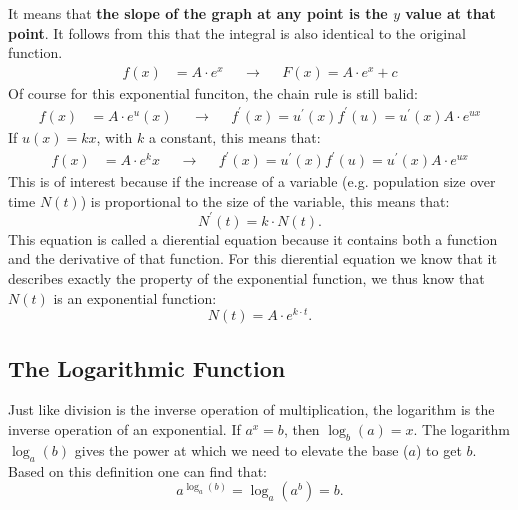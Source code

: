 \documentclass[a4paper]{report}
\begin{document}
It means that \textbf{the slope of the graph at any point is the $y$ value at that
point}. It follows from this that the integral is also identical to the original function.
\begin{align}
f(x)& = A \cdot e^x & &\rightarrow& &F(x) =  A \cdot e^x  + c
\end{align}
Of course for this exponential funciton, the chain rule is still balid:
\begin{align}
f(x)& = A \cdot e^u(x) & &\rightarrow& & f^\prime(x) = u^\prime(x)f^\prime(u) = u^\prime(x)A \cdot e^{ux} 
\end{align}
If $u(x)=kx$, with $k$ a constant, this means that:
\begin{align}
f(x)& = A \cdot e^kx & &\rightarrow& & f^\prime(x) = u^\prime(x)f^\prime(u) = u^\prime(x)A \cdot e^{ux} 
\end{align}
This is of interest because if the increase of a variable (e.g. population size over time $N(t)$) is proportional to the size of the variable, this means that:
\begin{equation}
N^\prime(t)=k \cdot N(t).
\end{equation}
This equation is called a dierential equation because it contains both a function and the derivative of that function. For this dierential equation we know that it describes exactly the property of the exponential function, we thus know that $N(t)$ is an exponential function:
\begin{equation}
N(t)=A \cdot e^{k \cdot t}.
\end{equation}

\subsection{The Logarithmic Function}
Just like division is the inverse operation of multiplication, the logarithm is the inverse operation of an exponential. If $a^x=b$, then $\log_b(a)=x$. The logarithm $\log_a(b)$ gives the power at which we need to elevate the base ($a$) to get $b$. Based on this definition one can find that:
\begin{equation*}
a^{\log_a(b)} = \log_a(a^b) = b.
\end{equation*}
\end{document}
